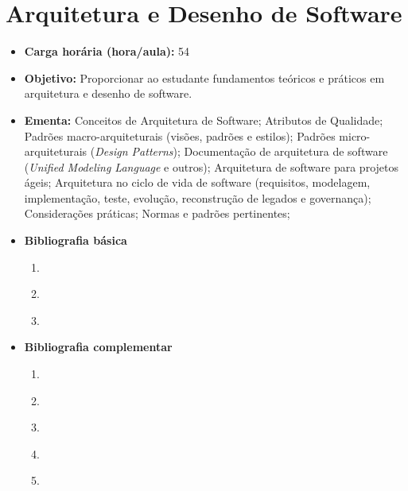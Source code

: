 \documentclass[11pt,fleqn]{book} %
\begin{document}
\section{Arquitetura e Desenho de Software}\label{2_arqsoft}
\begin{itemize}
	\item \textbf{Carga horária (hora/aula):} 54
	\item \textbf{Objetivo:} Proporcionar ao estudante fundamentos teóricos e práticos em arquitetura e desenho de software.
	\item \textbf{Ementa:} 
	Conceitos de Arquitetura de Software;
	Atributos de Qualidade;
	Padrões macro-arquiteturais (visões, padrões e estilos);
	Padrões micro-arquiteturais (\textit{Design Patterns});
	Documentação de arquitetura de software (\textit{Unified Modeling Language} e outros);
	Arquitetura de software para projetos ágeis;
	Arquitetura no ciclo de vida de software (requisitos, modelagem, implementação, teste, evolução, reconstrução de legados e governança);
	Considerações práticas;
	Normas e padrões pertinentes;
	\item \textbf{Bibliografia básica}
	\begin{enumerate}
		\item ~\cite{sommerville2011engenharia}
		\item ~\cite{pressman2016engenharia}
		\item ~\cite{booch2012uml}
	\end{enumerate}
	\item \textbf{Bibliografia complementar}
	\begin{enumerate}
		\item ~\cite{wazlawick2011analise}
		\item ~\cite{larman2007utilizando}
		\item ~\cite{fowler_tortello_2005}
		\item ~\cite{teruel_2012}
		\item ~\cite{silveira_2012}
	\end{enumerate}
\end{itemize}


\newpage
\end{document}
